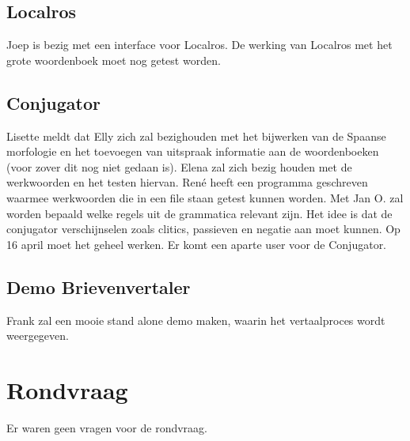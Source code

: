 \subsection {Localros} 

Joep is bezig met een interface voor Localros. De werking van Localros met het 
grote woordenboek moet nog getest worden. 

\subsection {Conjugator}

Lisette meldt dat Elly zich zal bezighouden met het bijwerken van de Spaanse 
morfologie en het toevoegen van uitspraak informatie aan de woordenboeken 
(voor zover dit nog niet gedaan is). Elena zal zich bezig houden met de 
werkwoorden
en het testen hiervan. Ren\'{e} heeft een programma geschreven waarmee 
werkwoorden 
die in een file staan getest kunnen worden. Met Jan O. zal worden bepaald 
welke regels uit
de grammatica relevant zijn. Het idee is dat de conjugator verschijnselen zoals 
clitics, passieven en negatie aan moet kunnen. Op 16 april moet het geheel 
werken. Er komt een aparte user voor de Conjugator.

\subsection {Demo Brievenvertaler}

Frank zal een mooie stand alone demo maken, waarin het vertaalproces wordt 
weergegeven. 

\section {Rondvraag}

Er waren geen vragen voor de rondvraag.


